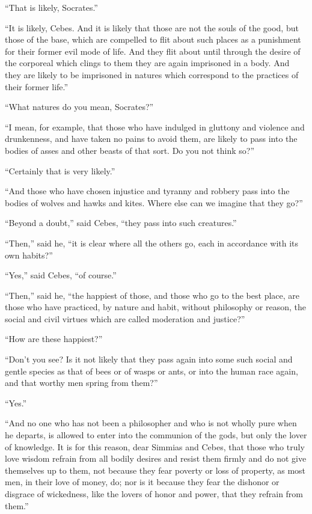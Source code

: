 \documentclass[letterpaper,12pt]{article}
\newcommand{\stephpag}[1]{\marginnote{\small\itshape\fontfamily{ppl}\selectfont #1}}
\begin{document}
\begin{drama}
``That is likely, Socrates.''
 
``It is likely, Cebes. And it is likely that those are not the souls of the good, but those of the base, which are compelled to flit about such places as a punishment for their former evil mode of life. And they flit about \stephpag{e} until through the desire of the corporeal which clings to them they are again imprisoned in a body. And they are likely to be imprisoned in natures which correspond to the practices of their former life.''
 
``What natures do you mean, Socrates?''
 
``I mean, for example, that those who have indulged in gluttony and violence and drunkenness, and have taken no pains to avoid them, are likely to pass into the bodies of asses and other beasts of that sort. \stephpag{82 a} Do you not think so?''
 
``Certainly that is very likely.''
 
``And those who have chosen injustice and tyranny and robbery pass into the bodies of wolves and hawks and kites. Where else can we imagine that they go?''
 
``Beyond a doubt,'' said Cebes, ``they pass into such creatures.''
 
``Then,'' said he, ``it is clear where all the others go, each in accordance with its own habits?''
 
``Yes,'' said Cebes, ``of course.''
 
``Then,'' said he, ``the happiest of those, and those who go to the best place, are those who have practiced, \stephpag{b} by nature and habit, without philosophy or reason, the social and civil virtues which are called moderation and justice?''
 
``How are these happiest?''
 
``Don't you see? Is it not likely that they pass again into some such social and gentle species as that of bees or of wasps or ants, or into the human race again, and that worthy men spring from them?''
 
``Yes.''
 
``And no one who has not been a philosopher and who is not wholly pure when he departs, is allowed to enter into the communion of the gods, \stephpag{c} but only the lover of knowledge. It is for this reason, dear Simmias and Cebes, that those who truly love wisdom refrain from all bodily desires and resist them firmly and do not give themselves up to them, not because they fear poverty or loss of property, as most men, in their love of money, do; nor is it because they fear the dishonor or disgrace of wickedness, like the lovers of honor and power, that they refrain from them.''
 

\end{drama}
\end{document}
